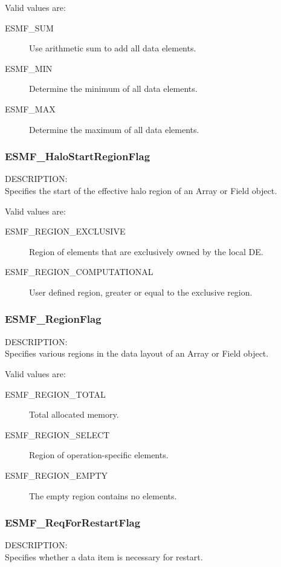 Valid values are:
\begin{description}
   \item [ESMF\_SUM]
         Use arithmetic sum to add all data elements.
   \item [ESMF\_MIN]
         Determine the minimum of all data elements.
   \item [ESMF\_MAX]
         Determine the maximum of all data elements.
\end{description}

\subsubsection{ESMF\_HaloStartRegionFlag}
\label{opt:halostartregionflag}
{\sf DESCRIPTION:\\}
Specifies the start of the effective halo region of an Array or Field object.

Valid values are:
\begin{description}
\item [ESMF\_REGION\_EXCLUSIVE]
      Region of elements that are exclusively owned by the local DE.
\item [ESMF\_REGION\_COMPUTATIONAL]
      User defined region, greater or equal to the exclusive region.
\end{description}

\subsubsection{ESMF\_RegionFlag}
\label{opt:regionflag}
{\sf DESCRIPTION:\\}
Specifies various regions in the data layout of an Array or Field object.

Valid values are:
\begin{description}
\item [ESMF\_REGION\_TOTAL]
      Total allocated memory.
\item [ESMF\_REGION\_SELECT]
      Region of operation-specific elements.
\item [ESMF\_REGION\_EMPTY]
      The empty region contains no elements.
\end{description}

\subsubsection{ESMF\_ReqForRestartFlag}
\label{opt:reqforrestartflag}
{\sf DESCRIPTION:\\}
Specifies whether a data item is necessary for restart.

